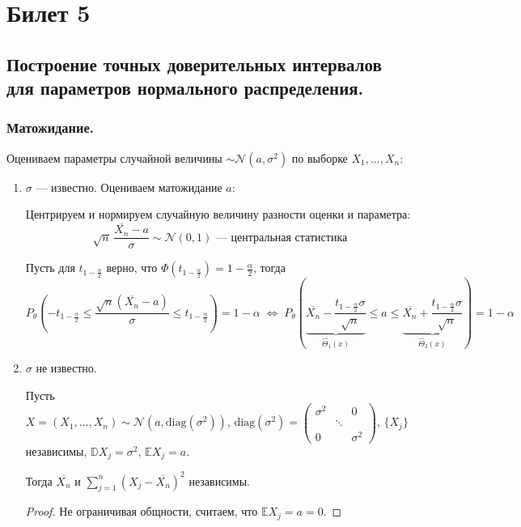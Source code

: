 \section{Билет 5}

\subsection{Построение точных доверительных интервалов для параметров нормального распределения.}

\subsubsection{Матожидание.}

Оцениваем параметры случайной величины $\sim \mathcal{N}(a, \sigma^2)$ по выборке $X_1, \dots, X_n$:
\begin{enumerate}
	\item $\sigma$ --- известно. Оцениваем матожидание $a$:
	
	Центрируем и нормируем случайную величину разности оценки и параметра:
	\[ \sqrt{n}\,\frac{\overline{X_n} - a}{\sigma} \sim \mathcal{N}(0, 1) \text{ --- центральная статистика} \]
	
	Пусть для $t_{1-\frac{\alpha}2}$ верно, что $\Phi \left( t_{1 - \frac{\alpha}2} \right) = 1 - \frac{\alpha}2$, тогда 
	\[ P_{\theta} \left( -t_{1 - \frac{\alpha}2} \le \frac{\sqrt{n}(\overline{X_n} - a)}{\sigma} \le t_{1 - \frac{\alpha}2} \right) = 
	1 - \alpha \;\Leftrightarrow\; 
	P_{\theta} \left( \underset{\hat\Theta_1(x)}{\underbrace{\overline{X_n} - \frac{t_{1 - \frac{\alpha}2} \sigma}{\sqrt{n}}}} \le a \le 
	\underset{\hat\Theta_2(x)}{\underbrace{\overline{X_n} + \frac{t_{1 - \frac{\alpha}2} \sigma}{\sqrt{n}}}} \right) = 1 - \alpha \]
	
	\item $\sigma$ не известно.
	
	\begin{lemma*}
		Пусть $X \!=\! (X_1, \dots, X_n) \sim \mathcal{N} \left( a, \text{diag}(\sigma^2) \right), \, \text{diag}(\sigma^2) \!=\! 
		\left(\begin{matrix} \sigma^2 && 0 \\[-5 pt] & \!\!\!\!\!\ddots\!\!\!\!\! & \\[-5 pt] 0 && \sigma^2 \end{matrix}\right)\!\!, \, \{ X_j \}$ независимы, $\mathbb{D} X_j \!=\! \sigma^2\!, \, \mathbb{E} X_j \!=\! a$.
		
		Тогда $\overline{X_n}$ и $\sum_{j=1}^n (X_j - \overline{X_n})^2$ независимы.
	\end{lemma*}
	\begin{proof}
		Не ограничивая общности, считаем, что $\mathbb{E} X_j = a = 0$.
		

\end{proof}
\end{enumerate}
